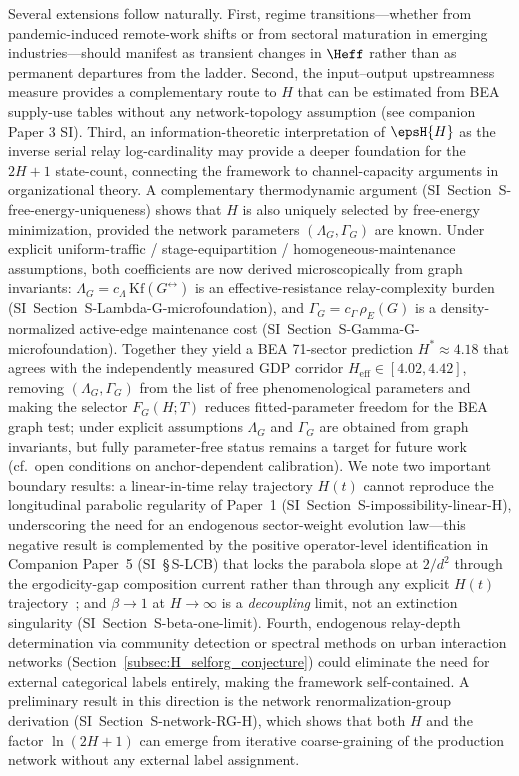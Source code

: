 Several extensions follow naturally.
First, regime transitions---whether from pandemic-induced remote-work shifts
or from sectoral maturation in emerging industries---should manifest as
transient changes in \(\Heff\) rather than as permanent departures from the
ladder.
Second, the input--output upstreamness measure provides a complementary route
to \(H\) that can be estimated from BEA supply-use tables without any
network-topology assumption (see companion Paper 3 SI).
Third, an information-theoretic interpretation of \(\epsH{H}\) as the
inverse serial relay log-cardinality may provide a deeper foundation for the
\(2H+1\) state-count, connecting the framework to channel-capacity arguments
in organizational theory.
A complementary thermodynamic argument (SI~Section~\textsf{S-free-energy-uniqueness})
shows that $H$ is also uniquely selected by free-energy minimization, provided
the network parameters $(\Lambda_G,\Gamma_G)$ are known.
Under explicit uniform-traffic / stage-equipartition / homogeneous-maintenance
assumptions, both coefficients are now derived microscopically from graph
invariants: $\Lambda_G=c_\Lambda\,\mathrm{Kf}(G^{\leftrightarrow})$ is an
effective-resistance relay-complexity burden
(SI~Section~\textsf{S-Lambda-G-microfoundation}), and
$\Gamma_G=c_\Gamma\,\rho_E(G)$ is a density-normalized active-edge maintenance
cost (SI~Section~\textsf{S-Gamma-G-microfoundation}).
Together they yield a BEA 71-sector prediction
$H^{\ast}\approx 4.18$ that agrees with the independently measured
GDP corridor $H_{\mathrm{eff}}\in[4.02,4.42]$, removing $(\Lambda_G,\Gamma_G)$
from the list of free phenomenological parameters and making the selector
$F_G(H;T)$ reduces fitted-parameter freedom for the BEA graph test; under explicit assumptions $\Lambda_G$ and $\Gamma_G$ are obtained from graph invariants, but fully parameter-free status remains a target for future work (cf.\ open conditions on anchor-dependent calibration).
We note two important boundary results:
a linear-in-time relay trajectory $H(t)$ cannot reproduce the
longitudinal parabolic regularity of Paper~1
(SI~Section~\textsf{S-impossibility-linear-H}), underscoring the need for
an endogenous sector-weight evolution law---this negative result is
complemented by the positive operator-level identification in Companion
Paper~5 (SI~\S\,S-LCB) that locks the parabola slope at $2/d^{2}$ through
the ergodicity-gap composition current rather than through any explicit
$H(t)$ trajectory~\cite{Kato2026e};
and $\beta\to 1$ at $H\to\infty$ is a \emph{decoupling} limit, not an
extinction singularity (SI~Section~\textsf{S-beta-one-limit}).
Fourth, endogenous relay-depth determination via community detection or
spectral methods on urban interaction networks
(Section~\ref{subsec:H_selforg_conjecture}) could eliminate the need for external
categorical labels entirely, making the framework self-contained.
A preliminary result in this direction is the network
renormalization-group derivation
(SI~Section~\textsf{S-network-RG-H}), which shows that both $H$ and
the factor $\ln(2H+1)$ can emerge from iterative coarse-graining of
the production network without any external label assignment.

